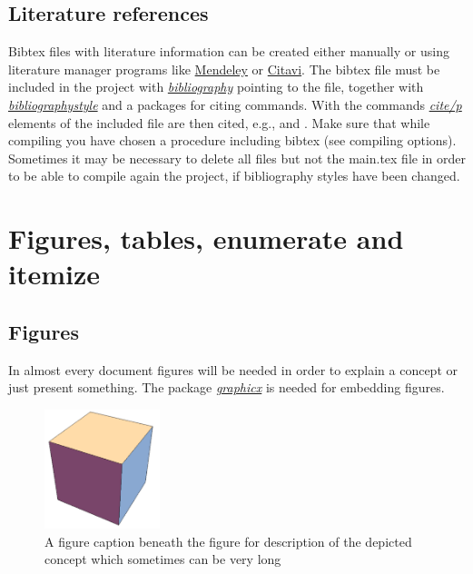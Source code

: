 \documentclass[a4paper,11pt,oneside]{book}
\newcommand{\imp}[1]{\underline{\textit{#1}}}
\begin{document}

\section{Literature references}

Bibtex files with literature information can be created either manually or using literature manager programs like \href{http://www.mendeley.com/}{Mendeley} or \href{http://citavi.com/en/index.html}{Citavi}. The bibtex file must be included in the project with \imp{bibliography} pointing to the file, together with \imp{bibliographystyle} and a packages for citing commands. With the commands \imp{cite/p} elements of the included file are then cited, e.g., \cite{Hill1952} and \citep{Kroner1977}. Make sure that while compiling you have chosen a procedure including bibtex (see compiling options). Sometimes it may be necessary to delete all files but not the main.tex file in order to be able to compile again the project, if bibliography styles have been changed.


\chapter{Figures, tables, enumerate and itemize}


\section{Figures}

In almost every document figures will be needed in order to explain a concept or just present something. The package \imp{graphicx} is needed for embedding figures.

\begin{figure}[!h]
	\centering
	\includegraphics[width=0.3\textwidth]{figures/cube}
	\caption{A figure caption beneath the figure for description of the depicted concept which sometimes can be very long}
	\label{ft_fig_firstfig}
\end{figure}
\end{document}
